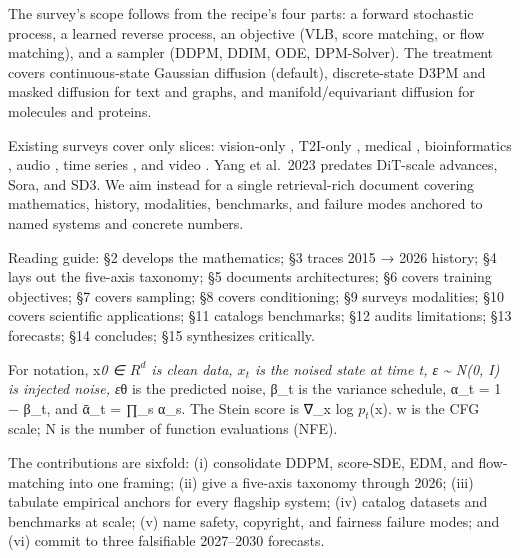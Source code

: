 \documentclass{article}
\begin{document}
The survey's scope follows from the recipe's four parts: a forward stochastic process, a learned reverse process, an objective (VLB, score matching, or flow matching), and a sampler (DDPM, DDIM, ODE, DPM-Solver). The treatment covers continuous-state Gaussian diffusion (default), discrete-state D3PM and masked diffusion for text and graphs, and manifold/equivariant diffusion for molecules and proteins.

Existing surveys cover only slices: vision-only \citep{croitoru2023diffusionmodelsinv}, T2I-only \citep{zhang20242024}, medical \citep{kazerouni2022diffusionmodelsfor}, bioinformatics \citep{guo2023diffusionmodelsinb}, audio \citep{zhang2023addingconditionalc}, time series \citep{lin2023diffusionmodelsfor}, and video \citep{melnik2024videodiffusionmode}. Yang et al.~2023 predates DiT-scale advances, Sora, and SD3. We aim instead for a single retrieval-rich document covering mathematics, history, modalities, benchmarks, and failure modes anchored to named systems and concrete numbers.

Reading guide: §2 develops the mathematics; §3 traces 2015 → 2026 history; §4 lays out the five-axis taxonomy; §5 documents architectures; §6 covers training objectives; §7 covers sampling; §8 covers conditioning; §9 surveys modalities; §10 covers scientific applications; §11 catalogs benchmarks; §12 audits limitations; §13 forecasts; §14 concludes; §15 synthesizes critically.

For notation, x\emph{0 ∈ \(R^d\) is clean data, \(x_t\) is the noised state at time t, ε \textasciitilde{} N(0, I) is injected noise, ε}θ is the predicted noise, β\_t is the variance schedule, α\_t = 1 − β\_t, and ᾱ\_t = ∏\_s α\_s. The Stein score is ∇\_x log \(p_t\)(x). w is the CFG scale; N is the number of function evaluations (NFE).

The contributions are sixfold: (i) consolidate DDPM, score-SDE, EDM, and flow-matching into one framing; (ii) give a five-axis taxonomy through 2026; (iii) tabulate empirical anchors for every flagship system; (iv) catalog datasets and benchmarks at scale; (v) name safety, copyright, and fairness failure modes; and (vi) commit to three falsifiable 2027--2030 forecasts.
\end{document}
